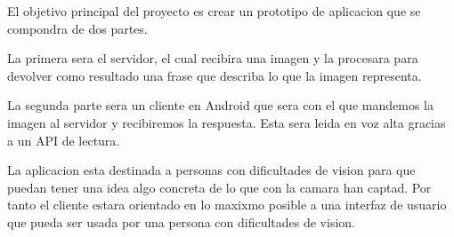 \label{chap:Introduccion}
El objetivo principal del proyecto es crear un prototipo de aplicacion que se compondra de dos partes.

La primera sera el servidor, el cual recibira una imagen y la procesara para devolver como resultado  una frase que describa lo que la imagen representa.

La segunda parte sera un cliente en Android que sera con el que mandemos la imagen al servidor y recibiremos la respuesta. Esta sera leida en voz alta gracias a un API de lectura.

La aplicacion esta destinada a personas con dificultades de vision para que puedan tener una idea algo concreta de lo que con la camara han captad. Por tanto el cliente estara orientado en lo maxixmo posible a una interfaz de usuario que pueda ser usada por una persona con dificultades de vision.